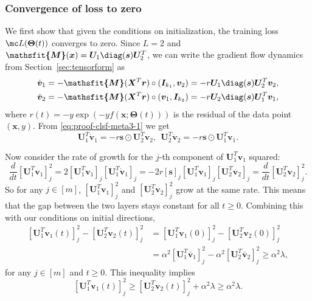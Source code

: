 \documentclass{article} %
\def\vr{{\bm{r}}}
\def\vs{{\bm{s}}}
\def\vv{{\bm{v}}}
\def\vx{{\bm{x}}}
\def\mI{{\bm{I}}}
\def\mU{{\bm{U}}}
\def\mX{{\bm{X}}}
\newcommand{\tens}[1]{\bm{\mathsfit{#1}}}
\def\tM{{\tens{M}}}
\newcommand{\bTheta}{\bm{\Theta}}
\begin{document}
\subsubsection{Convergence of loss to zero}
We first show that given the conditions on initialization, the training loss $\mc L(\bTheta(t))$ converges to zero. 
Since $L=2$ and $\tM(\vx) = \mU_1\diag(\vs)\mU_2^T$, we can write the gradient flow dynamics from Section~\ref{sec:tensorform} as
\begin{equation}
\label{eq:proof-clsf-meta3-1}
\begin{aligned}
    \dot \vv_1
    &= -\tM(\mX^T \vr) \circ (\mI_{k_1}, \vv_2)
    = -r \mU_1 \diag(\vs) \mU_2^T \vv_2,\\
    \dot \vv_2
    &= -\tM(\mX^T \vr) \circ (\vv_1, \mI_{k_2})
    = -r \mU_2 \diag(\vs) \mU_1^T \vv_1,
\end{aligned}
\end{equation}
where $r(t) = -y \exp(-y f(\vx;\bTheta(t)))$ is the residual of the data point $(\vx,y)$.
From \eqref{eq:proof-clsf-meta3-1} we get
\begin{equation}
\label{eq:proof-clsf-meta3-2}
    \mU_1^T \dot \vv_1 = -r \vs \odot \mU_2^T \vv_2,~~
    \mU_2^T \dot \vv_2 = -r \vs \odot \mU_1^T \vv_1.
\end{equation}

Now consider the rate of growth for the $j$-th component of $\mU_1^T \vv_1$ squared:
\begin{equation}
\label{eq:proof-clsf-meta3-15}
    \frac{d}{dt} [\mU_1^T \vv_1]_j^2
    = 2 [\mU_1^T \vv_1]_j [\mU_1^T \dot \vv_1]_j
    = -2 r [\vs]_j [\mU_1^T \vv_1]_j [\mU_2^T \vv_2]_j
    = \frac{d}{dt} [\mU_{2}^T \vv_{2}]_j^2.
\end{equation}
So for any $j\in [m]$, $[\mU_1^T \vv_1]_j^2$ and $[\mU_2^T \vv_2]_j^2$ grow at the same rate. This means that the gap between the two layers stays constant for all $t \geq 0$. Combining this with our conditions on initial directions,
\begin{equation}
\label{eq:proof-clsf-meta3-9}
\begin{aligned}
    [\mU_1^T \vv_1(t)]_j^2 - [\mU_2^T \vv_2(t)]_j^2
    &= [\mU_1^T \vv_1(0)]_j^2 - [\mU_2^T \vv_2(0)]_j^2\\
    &= \alpha^2 [\mU_1^T \bar \vv_1]_j^2 - \alpha^2 [\mU_2^T \bar \vv_2]_j^2 \geq \alpha^2 \lambda,
\end{aligned}
\end{equation}
for any $j \in [m]$ and $t \geq 0$. This inequality implies
\begin{equation}
\label{eq:proof-clsf-meta3-3}
    [\mU_1^T \vv_1(t)]_j^2 
    \geq 
    [\mU_2^T \vv_2(t)]_j^2 + \alpha^2 \lambda
    \geq
    \alpha^2 \lambda.
\end{equation}
\end{document}
